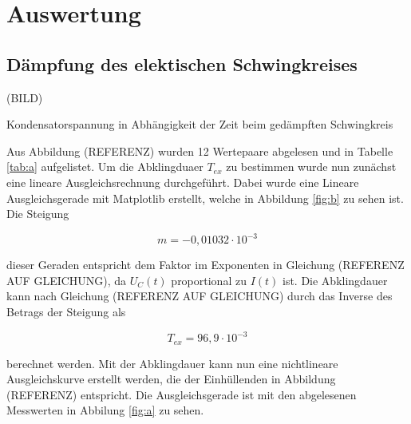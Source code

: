 \section{Auswertung}
\label{sec:Auswertung}
\subsection{Dämpfung des elektischen Schwingkreises}
(BILD)

\begin{table}[H]
  \centering
  
  
  \caption{Kondensatorspannung in Abhängigkeit der Zeit beim gedämpften Schwingkreis}
  \label{tab:a}
\end{table}

\noindent Aus Abbildung (REFERENZ) wurden 12 Wertepaare
abgelesen und in Tabelle \ref{tab:a} aufgelistet. Um
die Abklingduaer $T_{ex}$ zu bestimmen wurde nun zunächst
eine lineare Ausgleichsrechnung durchgeführt. Dabei
wurde eine Lineare Ausgleichsgerade mit Matplotlib
erstellt, welche in Abbildung \ref{fig:b} zu sehen ist.
Die Steigung

\begin{equation*}
  m=-0,01032\cdot 10^{-3}
\end{equation*}

\noindent dieser Geraden entspricht dem Faktor im Exponenten in Gleichung (REFERENZ AUF GLEICHUNG),
da $U_C(t)$ proportional zu $I(t)$ ist. Die Abklingdauer
kann nach Gleichung (REFERENZ AUF GLEICHUNG) durch das 
Inverse des Betrags der Steigung als 

\begin{equation*}
  T_{ex}=96,9\cdot10^{-3}
\end{equation*}

\noindent berechnet werden. Mit der Abklingdauer kann nun eine nichtlineare Ausgleichskurve
erstellt werden, die der Einhüllenden in Abbildung (REFERENZ)
entspricht. Die Ausgleichsgerade ist mit den abgelesenen
Messwerten in Abbilung \ref{fig:a} zu sehen.

